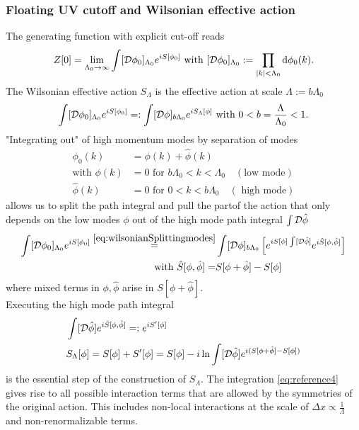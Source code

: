 \subsubsection{Floating UV cutoff and Wilsonian effective action}
\begin{mybox}{}
	The generating function with explicit cut-off reads
	\begin{equation}
	Z[0] = \lim_{\Lambda_0 \rightarrow \infty} \int [\mathcal{D} \phi_0]_{\Lambda_0} e^{i S[\phi_0]} \text{ with } [\mathcal{D} \phi_0]_{\Lambda_0} := \prod_{\abs{k}<\Lambda_0} \mathrm{d} \phi_0 (k).
		\end{equation}
	The Wilsonian effective action $S_\Lambda$ is the effective action at scale $\Lambda:=b\Lambda_0$
	\begin{equation}
	\label{eq:wilsonianeffectiveaction}
		\int [\mathcal{D} \phi_0]_{\Lambda_0} e^{i S[\phi_0]} =: \int [\mathcal{D}\phi]_{b\Lambda_0} e^{iS_\Lambda[\phi]} \text{ with } 0<b=\frac{\Lambda}{\Lambda_0}<1.
	\end{equation}
	"Integrating out" of high momentum modes by separation of modes
	\begin{align}
		\phi_0(k) &= \phi(k) +\hat{ \phi}(k)\label{eq:wilsonianSplittingmodes} \\
		\text{with } \phi(k) &= 0 \text{ for } b\Lambda_0<k<\Lambda_0 \quad (\text{low mode})\\
		\hat{ \phi}(k) &= 0 \text{ for } 0<k<b\Lambda_0 \quad (\text{ high mode})
	\end{align}
allows us to split the path integral and pull the partof the action that only depends on the low modes $\phi$ out of the high mode path integral $\int \mathcal{D} \hat{ \phi}$
	\begin{align}
		\int [\mathcal{D} \phi_0]_{\Lambda_0} e^{i S[\phi_0]} \stackrel{\ref{eq:wilsonianSplittingmodes}}{=}& \int [\mathcal{D}\phi]_{b\Lambda_0}\left[e^{iS[\phi] \int [\mathcal{D} \hat{ \phi}]} e^{i \hat{S}[\phi,\hat{ \phi}]}\right]  \\
		\text{ with } \hat{S}[\phi,\hat{ \phi}] =& S[\phi+\hat{ \phi}]-S[\phi]
	\end{align}
where mixed terms in $\phi,\hat{ \phi}$ arise in $S[\phi+\hat{ \phi}]$.\\
Executing the high mode path integral
\begin{align}
	\label{eq:reference4}
&	\int [\mathcal{D} \hat{ \phi}] e^{i \hat{S}[\phi,\hat{ \phi}]} =: e^{i S^\prime[\phi]}\\
&S_\Lambda[\phi] = S[\phi] + S^\prime[\phi] = S[\phi] -i \ln \int [\mathcal{D} \hat{ \phi}] e^{i (S[\phi+\hat{ \phi} ] - S[\phi])}
\end{align}
is the essential step of the construction of $S_\Lambda$. The integration \ref{eq:reference4} gives rise to all possible interaction terms that are allowed by the symmetries of the original action. This includes non-local interactions at the scale of $\Delta x \propto \frac{1}{\Lambda}$ and non-renormalizable terms.
	
\end{mybox}




